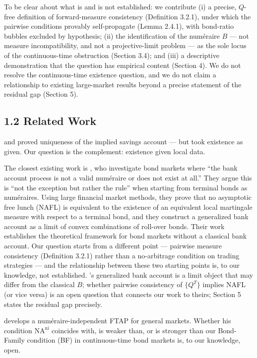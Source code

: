 \documentclass[
]{article}
\begin{document}
To be clear about what is and is not established: we contribute (i) a
precise, \(Q\)-free definition of forward-measure consistency
(Definition 3.2.1), under which the pairwise conditions provably
self-propagate (Lemma 2.4.1), with bond-ratio bubbles excluded by
hypothesis; (ii) the identification of the numéraire \(B\) --- not
measure incompatibility, and not a projective-limit problem --- as the
sole locus of the continuous-time obstruction (Section 3.4); and (iii) a
descriptive demonstration that the question has empirical content
(Section 4). We do not resolve the continuous-time existence question,
and we do not claim a relationship to existing large-market results
beyond a precise statement of the residual gap (Section 5).

\subsection{1.2 Related Work}\label{related-work}

\citet{MusielaRutkowski1997} and \citet{DoberleinSchweizerStricker2000} proved uniqueness of the implied savings account --- but took
existence as given. Our question is the complement: existence given
local data.

The closest existing work is \citet{KleinSchmidtTeichmann2016}, who
investigate bond markets where ``the bank account process is not a valid
numéraire or does not exist at all.'' They argue this is ``not the
exception but rather the rule'' when starting from terminal bonds as
numéraires. Using large financial market methods, they prove that no
asymptotic free lunch (NAFL) is equivalent to the existence of an
equivalent local martingale measure with respect to a terminal bond, and
they construct a generalized bank account as a limit of convex
combinations of roll-over bonds. Their work establishes the theoretical
framework for bond markets without a classical bank account. Our
question starts from a different point --- pairwise measure consistency
(Definition 3.2.1) rather than a no-arbitrage condition on trading
strategies --- and the relationship between these two starting points
is, to our knowledge, not established. \citeauthor{KleinSchmidtTeichmann2016}'s
generalized bank account is a limit object that may differ from the
classical \(B\); whether pairwise consistency of \(\{Q^T\}\) implies
NAFL (or vice versa) is an open question that connects our work to
theirs; Section 5 states the residual gap precisely.

\citet{Herdegen2017} develops a numéraire-independent FTAP for general
markets. Whether his condition \(\text{NA}^{\text{ni}}\) coincides with,
is weaker than, or is stronger than our Bond-Family condition (BF) in
continuous-time bond markets is, to our knowledge, open.
\end{document}

